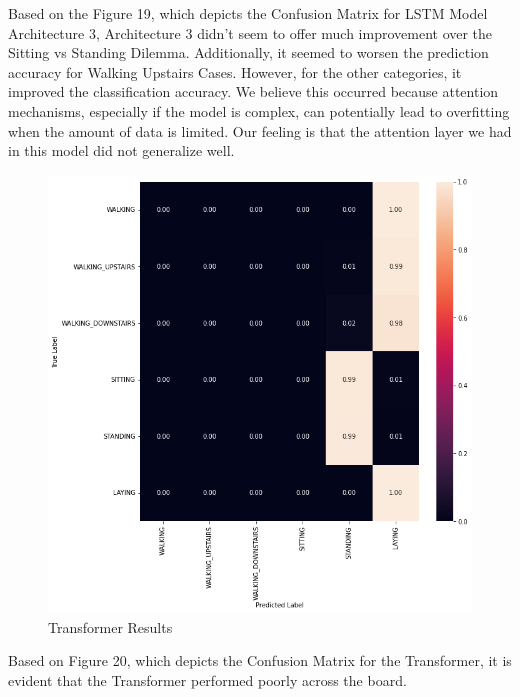 \documentclass[conference]{IEEEtran}
\begin{document}
Based on the Figure 19, which depicts the Confusion Matrix for LSTM Model Architecture 3, Architecture 3 didn't seem to offer much improvement over the Sitting vs Standing Dilemma. Additionally, it seemed to worsen the prediction accuracy for Walking Upstairs Cases. However, for the other categories, it improved the classification accuracy. We believe this occurred because attention mechanisms, especially if the model is complex, can potentially lead to overfitting when the amount of data is limited. Our feeling is that the attention layer we had in this model did not generalize well. 

\begin{figure}
    \centering
    \includegraphics[width= 0.9 \linewidth]{transformer_results.png}
    \caption{Transformer Results}
    \label{transformer_results.png}
\end{figure}

Based on Figure 20, which depicts the Confusion Matrix for the Transformer, it is evident that the Transformer performed poorly across the board. 
\end{document}
